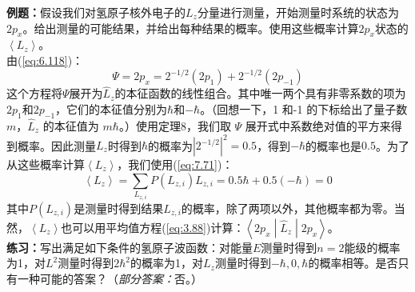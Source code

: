    \begin{examplebox}
        \textbf{例题：}假设我们对氢原子核外电子的$L_z$分量进行测量，开始测量时系统的状态为$2p_x$。给出测量的可能结果，并给出每种结果的概率。使用这些概率计算$2p_x$状态的$\left\langle L_z \right\rangle$。
        \\

        由(\ref{eq:6.118})：
        \begin{equation*}
            \Psi = 2p_x = 2^{-1/2}\left(2p_1\right) + 2^{-1/2}\left(2p_{-1}\right)
        \end{equation*}
        这个方程将$\Psi$展开为$\hat{L}_z$的本征函数的线性组合。其中唯一两个具有非零系数的项为$2p_1$和$2p_{-1}$，它们的本征值分别为$\hbar$和$-\hbar$。（回想一下，1 和-1 的下标给出了量子数$m$，$\hat{L}_z$ 的本征值为 $m\hbar$。）使用定理8，我们取 $\Psi$ 展开式中系数绝对值的平方来得到概率。因此测量$L_z$时得到$\hbar$的概率为$\left|2^{-1/2}\right|^2 = 0.5$，得到$-\hbar$的概率也是$0.5$。为了从这些概率计算$\left\langle L_z \right\rangle$，我们使用(\ref{eq:7.71})：
        \begin{equation*}
            \left\langle L_z \right\rangle = \sum_{L_{z,i}}P\left(L_{z,i}\right)L_{z,i} = 0.5\hbar + 0.5\left(-\hbar\right) = 0
        \end{equation*}
        其中$P\left(L_{z,i}\right)$是测量时得到结果$L_{z,i}$的概率，除了两项以外，其他概率都为零。当然，$\left\langle L_z \right\rangle$也可以用平均值方程(\ref{eq:3.88})计算：$\left\langle 2p_x \middle| \hat{L}_z \middle| 2p_x \right\rangle$。
        \\

        \textbf{练习：}写出满足如下条件的氢原子波函数：对能量$E$测量时得到$n=2$能级的概率为1，对$L^2$测量时得到$2\hbar^2$的概率为1，对$L_z$测量时得到$-\hbar,0,\hbar$的概率相等。是否只有一种可能的答案？（\textit{部分答案：}否。）
    \end{examplebox}
